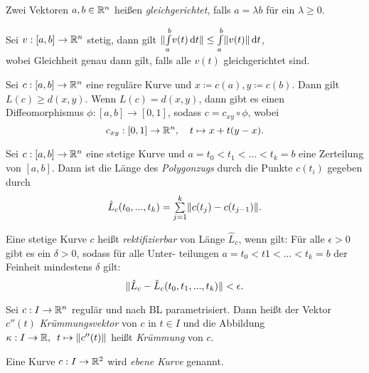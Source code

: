 \documentclass{cheat-sheet}
\newcommand{\Intabdt}[1]{\Int{a}{b}{#1}{t}}
\begin{document}
\begin{defn}
  Zwei Vektoren $a, b \in \mathbb{R}^n$ heißen \emph{gleichgerichtet}, falls $a = \lambda b$ für ein $\lambda \geq 0$.
\end{defn}

\begin{satz}
  Sei $v : [a, b] \to \mathbb{R}^n$ stetig, dann gilt $\norm{\Intabdt{v(t)}} \leq \Intabdt{\norm{v(t)}}$,\\
  wobei Gleichheit genau dann gilt, falls alle $v(t)$ gleichgerichtet sind.
\end{satz}

\begin{satz}
  Sei $c : [a, b] \to \mathbb{R}^n$ eine reguläre Kurve und $x \coloneqq c(a), y \coloneqq c(b)$. Dann gilt $L(c) \geq d(x, y)$. Wenn $L(c) = d(x, y)$, dann gibt es einen Diffeomorphismus $\phi : [a, b] \to [0, 1]$, sodass $c = c_{xy} \circ \phi$, wobei
  \[ c_{xy} : \left[ 0, 1 \right] \to \mathbb{R}^n, \quad t \mapsto x + t (y - x). \]
\end{satz}


\begin{defn}
  Sei $c : [a, b] \to \mathbb{R}^n$ eine stetige Kurve und $a = t_0 < t_1 < ... < t_k = b$ eine Zerteilung von $[a, b]$. Dann ist die Länge des \emph{Polygonzugs} durch die Punkte $c(t_i)$ gegeben durch
  \[ \hat{L}_c(t_0, ..., t_k) = \sum_{j=1}^k \norm{c(t_j) - c(t_{j-1})}. \]
\end{defn}

\begin{defn}
  Eine stetige Kurve $c$ heißt \emph{rektifizierbar} von Länge $\hat{L}_c$, wenn gilt: Für alle $\epsilon > 0$ gibt es ein $\delta > 0$, sodass für alle Unter- teilungen $a = t_0 < t1 < ... < t_k = b$ der Feinheit mindestens $\delta$ gilt:
  \[ \lVert\hat{L}_c - \hat{L}_c(t_0, t_1, ..., t_k)\rVert < \epsilon. \]
\end{defn}


\begin{defn}
  Sei $c : I \to \mathbb{R}^n$ regulär und nach BL parametrisiert. Dann heißt der Vektor $c''(t)$ \emph{Krümmungsvektor} von $c$ in $t \in I$ und die Abbildung $\kappa : I \to \mathbb{R}, \enspace t \mapsto \lVert c''(t)\rVert$ heißt \emph{Krümmung} von $c$. %
\end{defn}

\begin{defn}
  Eine Kurve $c : I \to \mathbb{R}^2$ wird \emph{ebene Kurve} genannt.
\end{defn}
\end{document}

